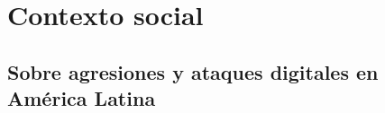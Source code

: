 \documentclass[12pt]{caltech_thesis}
\begin{document}








\chapter{Contexto social}

\section{Sobre agresiones y ataques digitales en América Latina}
\end{document}
